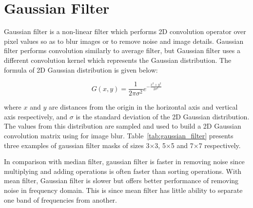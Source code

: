 \section{Gaussian Filter}

Gaussian filter is a non-linear filter which performs 2D convolution operator over pixel values so as to blur images or to remove noise and image details. Gaussian filter performs convolution  similarly to average filter, but Gaussian filter uses a different convolution kernel which represents the Gaussian distribution. The formula of 2D Gaussian distribution is given below: 

\begin{equation}
	G(x,y)={\frac {1}{2\pi \sigma ^{2}}}e^{-{\frac {x^{2}+y^{2}}{2\sigma ^{2}}}}
\end{equation}

where $x$ and $y$ are distances from the origin in the horizontal axis and vertical axis respectively, and $\sigma$ is the standard deviation of the 2D Gaussian distribution. The values from this distribution are sampled and used to build a 2D Gaussian convolution matrix using for image blur. Table~\ref{tab:gaussian_filter} presents three examples of gaussian filter masks of sizes 3$\times$3, 5$\times$5 and 7$\times$7 respectively.

In comparison with median filter, gaussian filter is faster in removing noise since multiplying and adding operations is often faster than sorting operations. With mean filter, Gaussian filter is slower but offers better performance of removing noise in frequency domain. This is since mean filter has little ability to separate one band of frequencies from another. 

